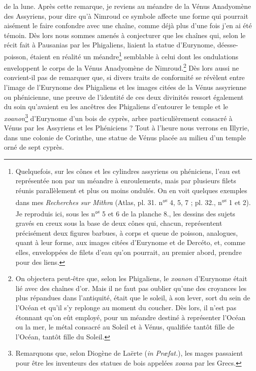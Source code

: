 \documentclass{article}
\begin{document}
de la lune. Après cette remarque, je reviens au méandre de la Vénus Anadyomène des Assyriens, pour dire qu'à Nimroud ce symbole affecte une forme qui pourrait aisément le faire confondre avec une chaîne, comme déjà plus d'une fois j'en ai été témoin. Dès lors nous sommes amenés à conjecturer que les chaînes qui, selon le récit fait à Pausanias par les Phigaliens, liaient la statue d'Eurynome, déesse-poisson, étaient en réalité un méandre\footnote{Quelquefois, sur les cônes et les cylindres assyriens ou phéniciens, l'eau est représentée non par un méandre à enroulements, mais par plusieurs filets réunis parallèlement et plus ou moins ondulés. On en voit quelques exemples dans mes \emph{Recherches sur Mithra} (Atlas, pl. 31. n°\textsuperscript{s} 4, 5, 7 ; pl. 32., n°\textsuperscript{s} 1 et 2). Je reproduis ici, sous les n°\textsuperscript{s} 5 et 6 de la planche 8., les dessins des sujets gravés en creux sous la base de deux cônes qui, chacun, représentent précisément deux figures barbues, à corps et queue de poisson, analogues, quant à leur forme, aux images citées d'Eurynome et de Dercéto, et, comme elles, enveloppées de filets d'eau qu'on pourrait, au premier abord, prendre pour des liens.} semblable à celui dont les ondulations enveloppent le corps de la Vénus Anadyomène de Nimroud.\footnote{On objectera peut-être que, selon les Phigaliens, le \emph{xoanon} d'Eurynome était lié avec des chaînes d'or. Mais il ne faut pas oublier qu'une des croyances les plus répandues dans l'antiquité, était que le soleil, à son lever, sort du sein de l'Océan et qu'il s'y replonge au moment du coucher. Dès lors, il n'est pas étonnant qu'on eût employé, pour un méandre destiné à représenter l'Océan ou la mer, le métal consacré au Soleil et à Vénus, qualifiée tantôt fille de l'Océan, tantôt fille du Soleil.} Dès lors aussi ne convient-il pas de remarquer que, si divers traits de conformité se révèlent entre l'image de l'Eurynome des Phigaliens et les images citées de la Vénus assyrienne ou phénicienne, une preuve de l'identité de ces deux divinités ressort également du soin qu'avaient eu les ancêtres des Phigaliens d'entourer le temple et le \emph{xoanon}\footnote{Remarquons que, selon Diogène de Laërte (\emph{in Præfat.}), les mages passaient pour être les inventeurs des statues de bois appelées \emph{xoana} par les Grecs.} d'Eurynome d'un bois de cyprès, arbre particulièrement consacré à Vénus par les Assyriens et les Phéniciens ? Tout à l'heure nous verrons en Illyrie, dans une colonie de Corinthe, une statue de Vénus placée au milieu d'un temple orné de sept cyprès.
\end{document}
